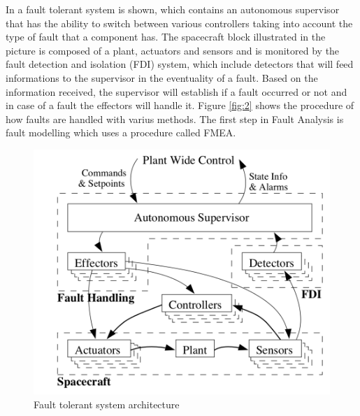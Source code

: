 In  a fault tolerant system is shown, which contains an autonomous supervisor that has the ability to switch between various controllers taking into account the type of fault that a component has. The spacecraft block illustrated in the picture is composed of a plant, actuators and sensors and is monitored by the fault detection and isolation  (FDI) system, which include detectors that will feed informations to the supervisor in the eventuality of a fault. Based on the information received, the supervisor will establish if a fault occurred or not and in case of a fault the effectors will handle it. Figure \ref{fig:2} shows the procedure of how faults are handled with varius methods. The first step in Fault Analysis is fault modelling which uses a procedure called FMEA.
\begin{table}[H]
	\begin{minipage}[b]{0.49\linewidth}
		\centering
		\begin{figure}[H]
			\centering
			\includegraphics[width=1\linewidth]{figures/FTC}
			\caption{Fault tolerant system architecture \cite{FTJ}}
			\label{fig:1}
		\end{figure}
	\end{minipage}\hfill
	\begin{minipage}[b]{0.49\linewidth}
		\centering
		\begin{figure}[H]
			\centering

\end{figure}
\end{minipage}
\end{table}
